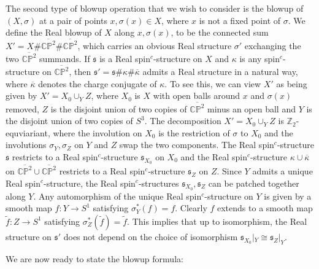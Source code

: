 \documentclass{amsart}
\theoremstyle{definition}
\theoremstyle{remark}
\numberwithin{equation}{section}
\begin{document}
The second type of blowup operation that we wish to consider is the blowup of $(X, \sigma)$ at a pair of points $x , \sigma(x) \in X$, where $x$ is not a fixed point of $\sigma$. We define the Real blowup of $X$ along $x,\sigma(x)$, to be the connected sum $X' = X \# \overline{\mathbb{CP}^2} \# \overline{\mathbb{CP}^2}$, which carries an obvious Real structure $\sigma'$ exchanging the two $\overline{\mathbb{CP}^2}$ summands. If $\mathfrak{s}$ is a Real spin$^c$-structure on $X$ and $\kappa$ is any spin$^c$-structure on $\overline{\mathbb{CP}^2}$, then $\mathfrak{s}' = \mathfrak{s} \# \kappa \# \overline{\kappa}$ admits a Real structure in a natural way, where $\overline{\kappa}$ denotes the charge conjugate of $\kappa$. To see this, we can view $X'$ as being given by $X' = X_0 \cup_Y Z$, where $X_0$ is $X$ with open balls around $x$ and $\sigma(x)$ removed, $Z$ is the disjoint union of two copies of $\overline{\mathbb{CP}^2}$ minus an open ball and $Y$ is the disjoint union of two copies of $S^3$. The decomposition $X' = X_0 \cup_Y Z$ is $\mathbb{Z}_2$-equviariant, where the involution on $X_0$ is the restriction of $\sigma$ to $X_0$ and the involutions $\sigma_Y, \sigma_Z$ on $Y$ and $Z$ swap the two components. The Real spin$^c$-structure $\mathfrak{s}$ restricts to a Real spin$^c$-structure $\mathfrak{s}_{X_0}$ on $X_0$ and the Real spin$^c$-structure $\kappa \cup \overline{\kappa}$ on $\overline{\mathbb{CP}^2} \cup \overline{\mathbb{CP}^2}$ restricts to a Real spin$^c$-structure $\mathfrak{s}_Z$ on $Z$. Since $Y$ admits a unique Real spin$^c$-structure, the Real spin$^c$-structures $\mathfrak{s}_{X_0}, \mathfrak{s}_Z$ can be patched together along $Y$. Any automorphism of the unique Real spin$^c$-structure on $Y$ is given by a smooth map $f : Y \to S^1$ satisfying $\sigma_Y^*(f) = f$. Clearly $f$ extends to a smooth map $\widetilde{f} : Z \to S^1$ satisfying $\sigma_Z^*(\widetilde{f}) = \widetilde{f}$. This implies that up to isomorphism, the Real structure on $\mathfrak{s}'$ does not depend on the choice of isomorphism $\mathfrak{s}_{X_0}|_Y \cong \mathfrak{s}_{Z}|_Y$.

We are now ready to state the blowup formula:
\end{document}
